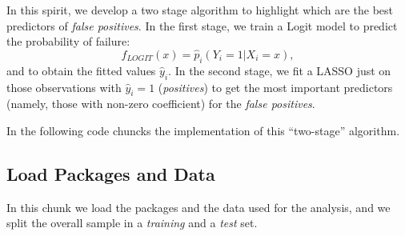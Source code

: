 \documentclass[]{article}
\begin{document}
\par

In this spirit, we develop a two stage algorithm to highlight which are
the best predictors of \textit{false positives}. In the first stage, we
train a Logit model to predict the probability of failure:
\begin{equation}
 f_{LOGIT}(x) = \hat{p}_i(Y_i = 1 | X_i = x),
\end{equation} and to obtain the fitted values \(\hat{y}_i\). In the
second stage, we fit a LASSO just on those observations with
\(\hat{y}_i=1\) (\textit{positives}) to get the most important
predictors (namely, those with non-zero coefficient) for the
\textit{false positives}.

\par

In the following code chuncks the implementation of this ``two-stage''
algorithm.

\hypertarget{load-packages-and-data}{%
\subsection{Load Packages and Data}\label{load-packages-and-data}}

In this chunk we load the packages and the data used for the analysis,
and we split the overall sample in a \textit{training} and a
\textit{test} set.
\end{document}
